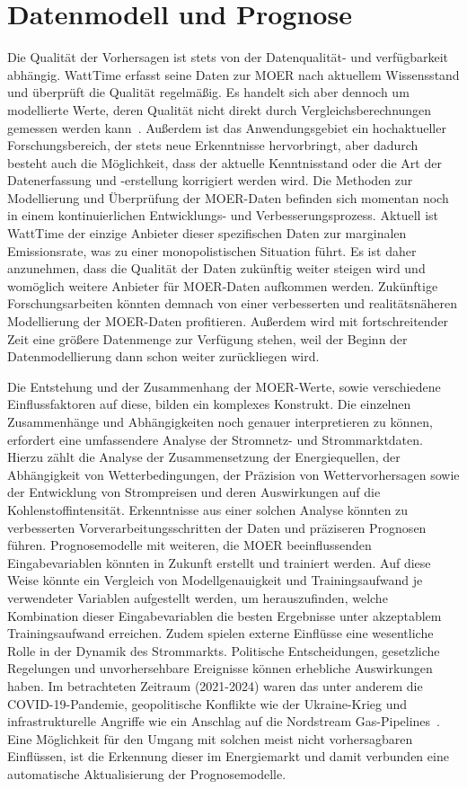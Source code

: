 \section{Datenmodell und Prognose}
Die Qualität der Vorhersagen ist stets von der Datenqualität- und verfügbarkeit abhängig.
WattTime erfasst seine Daten zur \ac{MOER} nach aktuellem Wissensstand und überprüft die Qualität regelmäßig.
Es handelt sich aber dennoch um modellierte Werte, deren Qualität nicht direkt durch Vergleichsberechnungen gemessen werden kann~\cite{WattTime.2022}.
Außerdem ist das Anwendungsgebiet ein hochaktueller Forschungsbereich, der stets neue Erkenntnisse hervorbringt, aber dadurch besteht auch die Möglichkeit, dass der aktuelle Kenntnisstand oder die Art der Datenerfassung und -erstellung korrigiert werden wird.
Die Methoden zur Modellierung und Überprüfung der \ac{MOER}-Daten befinden sich momentan noch in einem kontinuierlichen Entwicklungs- und Verbesserungsprozess.
Aktuell ist WattTime der einzige Anbieter dieser spezifischen Daten zur marginalen Emissionsrate, was zu einer monopolistischen Situation führt.
Es ist daher anzunehmen, dass die Qualität der Daten zukünftig weiter steigen wird und womöglich weitere Anbieter für \ac{MOER}-Daten aufkommen werden.
Zukünftige Forschungsarbeiten könnten demnach von einer verbesserten und realitätsnäheren Modellierung der \ac{MOER}-Daten profitieren.
Außerdem wird mit fortschreitender Zeit eine größere Datenmenge zur Verfügung stehen, weil der Beginn der Datenmodellierung dann schon weiter zurückliegen wird.

Die Entstehung und der Zusammenhang der \ac{MOER}-Werte, sowie verschiedene Einflussfaktoren auf diese, bilden ein komplexes Konstrukt.
Die einzelnen Zusammenhänge und Abhängigkeiten noch genauer interpretieren zu können, erfordert eine umfassendere Analyse der Stromnetz- und Strommarktdaten.
Hierzu zählt die Analyse der Zusammensetzung der Energiequellen, der Abhängigkeit von Wetterbedingungen, der Präzision von Wettervorhersagen sowie der Entwicklung von Strompreisen und deren Auswirkungen auf die Kohlenstoffintensität.
Erkenntnisse aus einer solchen Analyse könnten zu verbesserten Vorverarbeitungsschritten der Daten und präziseren Prognosen führen.
Prognosemodelle mit weiteren, die \ac{MOER} beeinflussenden Eingabevariablen könnten in Zukunft erstellt und trainiert werden.
Auf diese Weise könnte ein Vergleich von Modellgenauigkeit und Trainingsaufwand je verwendeter Variablen aufgestellt werden, um herauszufinden, welche Kombination dieser Eingabevariablen die besten Ergebnisse unter akzeptablem Trainingsaufwand erreichen.
Zudem spielen externe Einflüsse eine wesentliche Rolle in der Dynamik des Strommarkts.
Politische Entscheidungen, gesetzliche Regelungen und unvorhersehbare Ereignisse können erhebliche Auswirkungen haben.
Im betrachteten Zeitraum (2021-2024) waren das unter anderem die COVID-19-Pandemie, geopolitische Konflikte wie der Ukraine-Krieg und infrastrukturelle Angriffe wie ein Anschlag auf die Nordstream Gas-Pipelines~\cite{Baumgartner.30.9.2022}.
Eine Möglichkeit für den Umgang mit solchen meist nicht vorhersagbaren Einflüssen, ist die Erkennung dieser im Energiemarkt und damit verbunden eine automatische Aktualisierung der Prognosemodelle.

